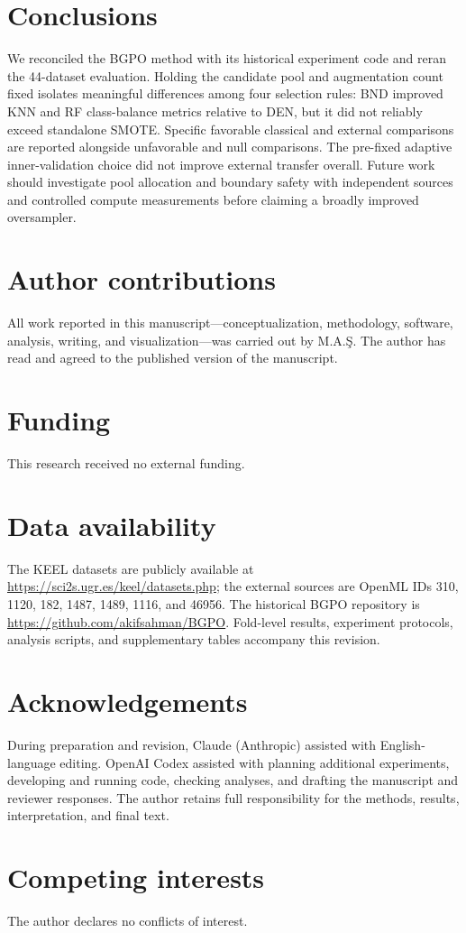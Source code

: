 \documentclass[pdflatex]{sn-jnl}
\begin{document}
\section{Conclusions}\label{sec:6}

We reconciled the BGPO method with its historical experiment code and reran the 44-dataset evaluation. Holding the candidate pool and augmentation count fixed isolates meaningful differences among four selection rules: BND improved KNN and RF class-balance metrics relative to DEN, but it did not reliably exceed standalone SMOTE. Specific favorable classical and external comparisons are reported alongside unfavorable and null comparisons. The pre-fixed adaptive inner-validation choice did not improve external transfer overall. Future work should investigate pool allocation and boundary safety with independent sources and controlled compute measurements before claiming a broadly improved oversampler.

\section*{Author contributions}
All work reported in this manuscript---conceptualization, methodology, software, analysis, writing, and visualization---was carried out by M.A.\c{S}. The author has read and agreed to the published version of the manuscript.

\section*{Funding}
This research received no external funding.

\section*{Data availability}
The KEEL datasets are publicly available at \url{https://sci2s.ugr.es/keel/datasets.php}; the external sources are OpenML IDs 310, 1120, 182, 1487, 1489, 1116, and 46956. The historical BGPO repository is \url{https://github.com/akifsahman/BGPO}. Fold-level results, experiment protocols, analysis scripts, and supplementary tables accompany this revision.

\section*{Acknowledgements}
During preparation and revision, Claude (Anthropic) assisted with English-language editing. OpenAI Codex assisted with planning additional experiments, developing and running code, checking analyses, and drafting the manuscript and reviewer responses. The author retains full responsibility for the methods, results, interpretation, and final text.

\section*{Competing interests}
The author declares no conflicts of interest.

\backmatter


\end{document}
